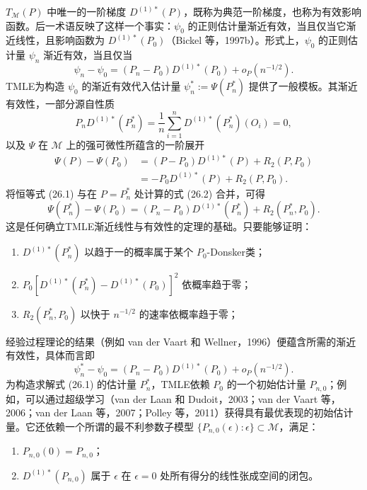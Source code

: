 $T_{\mathcal M}(P)$ 中唯一的一阶梯度 $D^{(1)*}(P)$，既称为典范一阶梯度，也称为有效影响函数。后一术语反映了这样一个事实：$\psi_0$ 的正则估计量渐近有效，当且仅当它渐近线性，且影响函数为 $D^{(1)*}(P_0)$（Bickel 等，1997b）。形式上，$\psi_0$ 的正则估计量 $\psi_n$ 渐近有效，当且仅当
\[
\psi_n-\psi_0=(P_n-P_0)D^{(1)*}(P_0)+o_P(n^{-1/2}).
\]
TMLE为构造 $\psi_0$ 的渐近有效代入估计量 $\psi_n^*:=\Psi(P_n^*)$ 提供了一般模板。其渐近有效性，一部分源自性质
\begin{equation}
P_nD^{(1)*}(P_n^*)=\frac1n\sum_{i=1}^nD^{(1)*}(P_n^*)(O_i)=0,
\tag{26.1}
\end{equation}
以及 $\Psi$ 在 $\mathcal M$ 上的强可微性所蕴含的一阶展开
\begin{equation}
\begin{aligned}
\Psi(P)-\Psi(P_0)
 &= (P-P_0)D^{(1)*}(P)+R_2(P,P_0)\\
 &= -P_0D^{(1)*}(P)+R_2(P,P_0).
\end{aligned}
\tag{26.2}
\end{equation}
将恒等式 (26.1) 与在 $P=P_n^*$ 处计算的式 (26.2) 合并，可得
\begin{equation}
\Psi(P_n^*)-\Psi(P_0)=(P_n-P_0)D^{(1)*}(P_n^*)+R_2(P_n^*,P_0).
\tag{26.3}
\end{equation}
这是任何确立TMLE渐近线性与有效性的定理的基础。只要能够证明：
\begin{enumerate}
\item $D^{(1)*}(P_n^*)$ 以趋于一的概率属于某个 $P_0$-Donsker类；
\item $P_0[D^{(1)*}(P_n^*)-D^{(1)*}(P_0)]^2$ 依概率趋于零；
\item $R_2(P_n^*,P_0)$ 以快于 $n^{-1/2}$ 的速率依概率趋于零；
\end{enumerate}
经验过程理论的结果（例如 van der Vaart 和 Wellner，1996）便蕴含所需的渐近有效性，具体而言即
\[
\psi_n^*-\psi_0=(P_n-P_0)D^{(1)*}(P_0)+o_P(n^{-1/2}).
\]
为构造求解式 (26.1) 的估计量 $P_n^*$，TMLE依赖 $P_0$ 的一个初始估计量 $P_{n,0}$；例如，可以通过超级学习（van der Laan 和 Dudoit，2003；van der Vaart 等，2006；van der Laan 等，2007；Polley 等，2011）获得具有最优表现的初始估计量。它还依赖一个所谓的最不利参数子模型 $\{P_{n,0}(\epsilon):\epsilon\}\subset\mathcal M$，满足：
\begin{enumerate}
\item $P_{n,0}(0)=P_{n,0}$；
\item $D^{(1)*}(P_{n,0})$ 属于 $\epsilon$ 在 $\epsilon=0$ 处所有得分的线性张成空间的闭包。
\end{enumerate}

